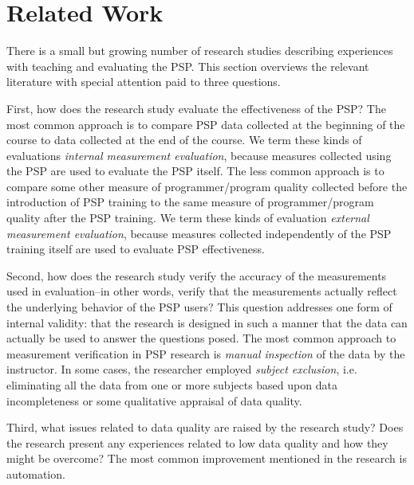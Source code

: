 
\section{Related Work}
\label{sec:related}

There is a small but growing number of research studies describing
experiences with teaching and evaluating the PSP. This section overviews
the relevant literature with special attention paid to three questions.

First, how does the research study evaluate the effectiveness of the PSP?
The most common approach is to compare PSP data collected at the beginning
of the course to data collected at the end of the course. We term these
kinds of evaluations {\em internal measurement evaluation}, because
measures collected using the PSP are used to evaluate the PSP itself.  The
less common approach is to compare some other measure of programmer/program
quality collected before the introduction of PSP training to the same
measure of programmer/program quality after the PSP training.  We term
these kinds of evaluation {\em external measurement evaluation}, because
measures collected independently of the PSP training itself are used to
evaluate PSP effectiveness.

Second, how does the research study verify the accuracy of the measurements
used in evaluation--in other words, verify that the measurements actually
reflect the underlying behavior of the PSP users?  This question addresses
one form of internal validity: that the research is designed
in such a manner that the data can actually be used to answer the questions
posed.  The most common approach to measurement verification in PSP
research is {\em manual inspection} of the data by the instructor. In some
cases, the researcher employed {\em subject exclusion}, i.e. eliminating
all the data from one or more subjects based upon data incompleteness or
some qualitative appraisal of data quality.

Third, what issues related to data quality are raised by the research
study?  Does the research present any experiences related to low data
quality and how they might be overcome?  The most common improvement 
mentioned in the research is automation. 


